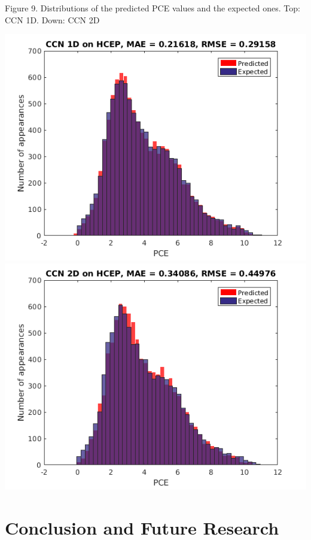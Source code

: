 \documentclass[a4paper]{article}
\begin{document}
\begin{center}
Figure 9. Distributions of the predicted PCE values and the expected ones. Top: CCN 1D. Down: CCN 2D
\end{center}
\begin{center}
\includegraphics[scale=0.4]{Result_CCN_1D}
\includegraphics[scale=0.4]{Result_CCN_2D}
\end{center}

\section{Conclusion and Future Research}
\end{document}
